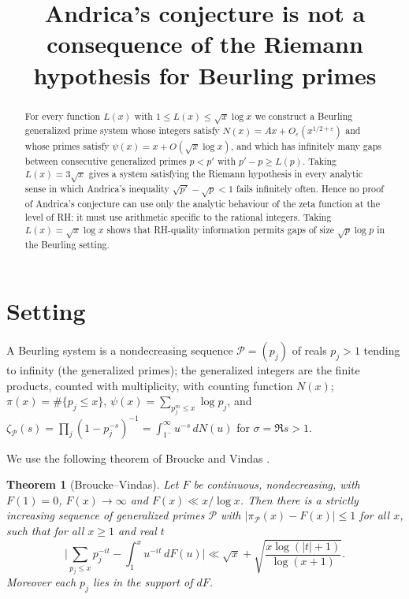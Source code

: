 \documentclass[11pt]{amsart}
\newtheorem{theorem}{Theorem}
\theoremstyle{remark}\newtheorem{remark}[theorem]{Remark}
\begin{document}
\title[Andrica and Beurling primes]{Andrica's conjecture is not a consequence of the Riemann hypothesis for Beurling primes}
\author{}
\date{}
\begin{abstract}
For every function $L(x)$ with $1\le L(x)\le \sqrt{x}\log x$ we construct a Beurling generalized prime system whose integers satisfy $N(x)=Ax+O_\varepsilon(x^{1/2+\varepsilon})$ and whose primes satisfy $\psi(x)=x+O(\sqrt{x}\log x)$, and which has infinitely many gaps between consecutive generalized primes $p<p'$ with $p'-p\ge L(p)$. Taking $L(x)=3\sqrt x$ gives a system satisfying the Riemann hypothesis in every analytic sense in which Andrica's inequality $\sqrt{p'}-\sqrt{p}<1$ fails infinitely often. Hence no proof of Andrica's conjecture can use only the analytic behaviour of the zeta function at the level of RH: it must use arithmetic specific to the rational integers. Taking $L(x)=\sqrt x\log x$ shows that RH-quality information permits gaps of size $\sqrt p\log p$ in the Beurling setting.
\end{abstract}
\maketitle

\section{Setting}
A Beurling system is a nondecreasing sequence $\mathcal P=(p_j)$ of reals $p_j>1$ tending to infinity (the generalized primes); the generalized integers are the finite products, counted with multiplicity, with counting function $N(x)$; $\pi(x)=\#\{p_j\le x\}$, $\psi(x)=\sum_{p_j^m\le x}\log p_j$, and $\zeta_{\mathcal P}(s)=\prod_j(1-p_j^{-s})^{-1}=\int_{1^-}^\infty u^{-s}\,dN(u)$ for $\sigma=\Re s>1$.

We use the following theorem of Broucke and Vindas \cite[Theorem~1.2]{BV}.

\begin{theorem}[Broucke--Vindas]\label{thm:BV}
Let $F$ be continuous, nondecreasing, with $F(1)=0$, $F(x)\to\infty$ and $F(x)\ll x/\log x$. Then there is a strictly increasing sequence of generalized primes $\mathcal P$ with $|\pi_{\mathcal P}(x)-F(x)|\le1$ for all $x$, such that for all $x\ge1$ and real $t$
\[
\Big|\sum_{p_j\le x}p_j^{-it}-\int_1^x u^{-it}\,dF(u)\Big|\ll \sqrt x+\sqrt{\frac{x\log(|t|+1)}{\log(x+1)}} .
\]
Moreover each $p_j$ lies in the support of $dF$.
\end{theorem}
\end{document}
